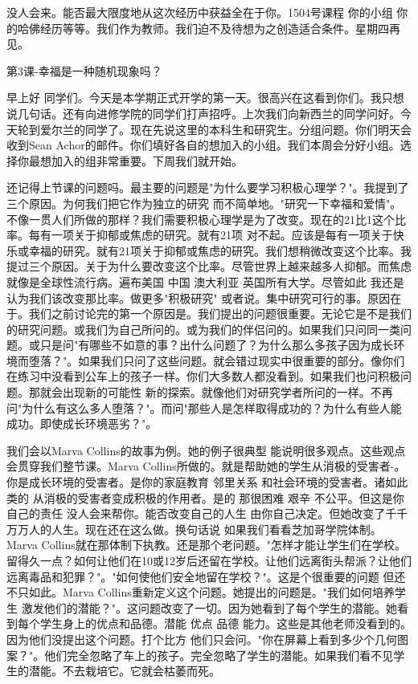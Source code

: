 没人会来。能否最大限度地从这次经历中获益全在于你。1504号课程 你的小组 你的哈佛经历等等。我们作为教师。我们迫不及待想为之创造适合条件。星期四再见。 

第3课-幸福是一种随机现象吗？ 

早上好 同学们。今天是本学期正式开学的第一天。很高兴在这看到你们。我只想说几句话。还有向进修学院的同学们打声招呼。上次我们向新西兰的同学问好。今天轮到爱尔兰的同学了。现在先说这里的本科生和研究生。分组问题。你们明天会收到Sean Achor的邮件。你们填好各自的想加入的小组。我们本周会分好小组。选择你最想加入的组非常重要。下周我们就开始。 

还记得上节课的问题吗。最主要的问题是"为什么要学习积极心理学？"。我提到了三个原因。为何我们把它作为独立的研究 而不简单地。"研究一下幸福和爱情"。不像一贯人们所做的那样？我们需要积极心理学是为了改变。现在的21比1这个比率。每有一项关于抑郁或焦虑的研究。就有21项 对不起。应该是每有一项关于快乐或幸福的研究。就有21项关于抑郁或焦虑的研究。我们想稍微改变这个比率。我提过三个原因。关于为什么要改变这个比率。尽管世界上越来越多人抑郁。而焦虑就像是全球性流行病。遍布美国 中国 澳大利亚 英国所有大学。尽管如此 我还是认为我们该改变那比率。做更多"积极研究" 或者说。集中研究可行的事。原因在于。我们之前讨论完的第一个原因是。我们提出的问题很重要。无论它是不是我们的研究问题。或我们为自己所问的。或为我们的伴侣问的。如果我们只问同一类问题。或只是问"有哪些不如意的事？出什么问题了？为什么那么多孩子因为成长环境而堕落？"。如果我们只问了这些问题。就会错过现实中很重要的部分。像你们在练习中没看到公车上的孩子一样。你们大多数人都没看到。如果我们也问积极问题。那就会出现新的可能性 新的探索。就像他们对研究学者所问的一样。不再问"为什么有这么多人堕落？"。而问"那些人是怎样取得成功的？为什么有些人能成功。即使成长环境恶劣？"。 

我们会以Marva Collins的故事为例。她的例子很典型 能说明很多观点。这些观点会贯穿我们整节课。Marva Collins所做的。就是帮助她的学生从消极的受害者-。你是成长环境的受害者。是你的家庭教育 邻里关系 和社会环境的受害者。诸如此类的 从消极的受害者变成积极的作用者。是的 那很困难 艰辛 不公平。但这是你自己的责任 没人会来帮你。能否改变自己的人生 由你自己决定。但她改变了千千万万人的人生。现在还在这么做。换句话说 如果我们看看芝加哥学院体制。Marva Collins就在那体制下执教。还是那个老问题。"怎样才能让学生们在学校。留得久一点？如何让他们在10或12岁后还留在学校。让他们远离街头帮派？让他们远离毒品和犯罪？"。"如何使他们安全地留在学校？"。这是个很重要的问题 但还不只如此。Marva Collins重新定义这个问题。她提出的问题是。"我们如何培养学生 激发他们的潜能？"。这问题改变了一切。因为她看到了每个学生的潜能。她看到每个学生身上的优点和品德。潜能 优点 品德 能力。这些是其他老师没看到的。因为他们没提出这个问题。打个比方 他们只会问。"你在屏幕上看到多少个几何图案？"。他们完全忽略了车上的孩子。完全忽略了学生的潜能。如果我们看不见学生的潜能。不去栽培它。它就会枯萎而死。 

